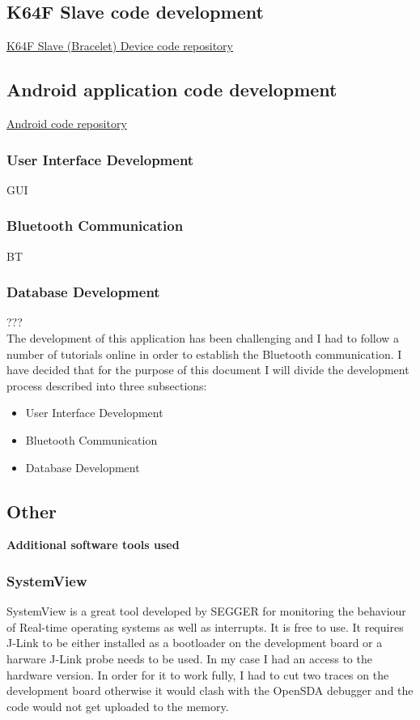 \documentclass[12pt,a4paper]{article}
\begin{document}
		\subsection{K64F Slave code development}
		\href{https://github.com/zedd-1983/project_dev2/tree/Bluetooth}{K64F Slave (Bracelet) Device code repository}\\
		
		\subsection{Android application code development}
		\href{https://github.com/zedd-1983/Easysleep_app/tree/bt_connection_3}{Android code repository}\\
		
		\subsubsection{User Interface Development}
		GUI\\
		\subsubsection{Bluetooth Communication}
		BT\\
		\subsubsection{Database Development}
		???\\
		
		The development of this application has been challenging and I had to follow a number of tutorials online in order to establish the Bluetooth communication. I have decided that for the purpose of this document I will divide the development process described into three subsections:  
		
		\begin{itemize}
			\item User Interface Development
			\item Bluetooth Communication
			\item Database Development
		\end{itemize}
		\newpage
		
		\subsection{Other}
		{\bfseries Additional software tools used}
		
		\subsubsection{SystemView}
		SystemView is a great tool developed by SEGGER for monitoring the behaviour of Real-time
		operating systems as well as interrupts. It is free to use. It requires J-Link to be either installed as a bootloader on the development board or a harware J-Link probe needs to be used. In my case I had an access to the hardware version. In order for it to work fully, I had to cut two traces on the development board otherwise it would clash with the OpenSDA debugger and the code would not get uploaded to the memory.
				
\end{document}

